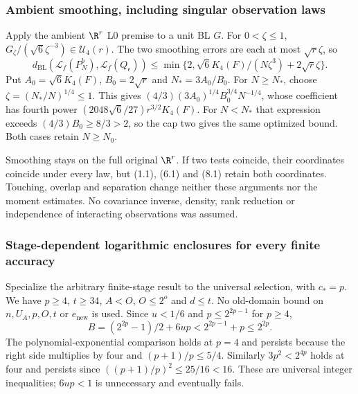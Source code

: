 \subsubsection{Ambient smoothing, including singular observation laws}
Apply the ambient $\R^r$ L0 premise to a unit BL $G$.
For $0<\zeta\le1$,
$G_\zeta/(\sqrt6\zeta^{-3})\in\mathcal U_4(r)$.
The two smoothing errors are each at most $\sqrt r\zeta$, so
\begin{equation}
 d_{\mathrm{BL}}(\mathcal L_f(P_N^b),\mathcal L_f(Q_\epsilon))
 \le\min\{2,\sqrt6K_4(F)/(N\zeta^3)+2\sqrt r\zeta\}.\tag{8.1}
\end{equation}
Put $A_0=\sqrt6K_4(F)$, $B_0=2\sqrt r$ and $N_*=3A_0/B_0$.
For $N\ge N_*$, choose $\zeta=(N_*/N)^{1/4}\le1$. This gives
$(4/3)(3A_0)^{1/4}B_0^{3/4}N^{-1/4}$, whose coefficient has fourth
power $(2048\sqrt6/27)r^{3/2}K_4(F)$.
For $N<N_*$ that expression exceeds $(4/3)B_0\ge8/3>2$, so the cap
two gives the same optimized bound. Both cases retain $N\ge N_0$.

Smoothing stays on the full original $\R^r$. If two tests coincide,
their coordinates coincide under every law, but (1.1), (6.1) and (8.1)
retain both coordinates. Touching, overlap and separation change neither
these arguments nor the moment estimates. No covariance inverse, density,
rank reduction or independence of interacting observations was assumed.

\subsubsection{Stage-dependent logarithmic enclosures for every finite accuracy}
Specialize the arbitrary finite-stage result to the universal selection,
with $c_*=p$. We have $p\ge4$, $t\ge34$, $A<O$, $O\le2^o$ and $d\le t$.
No old-domain bound on $n,U_A,p,O,t$ or $e_{\mathrm{new}}$ is used.
Since $u<1/6$ and $p\le2^{2p-1}$ for $p\ge4$,
\begin{equation}
 B=(2^{2p}-1)/2+6up<2^{2p-1}+p\le2^{2p}.\tag{9.1}
\end{equation}
The polynomial-exponential comparison holds at $p=4$ and persists because
the right side multiplies by four and $(p+1)/p\le5/4$.
Similarly $3p^2<2^{4p}$ holds at four and persists since
$((p+1)/p)^2\le25/16<16$. These are universal integer inequalities;
$6up<1$ is unnecessary and eventually fails.

